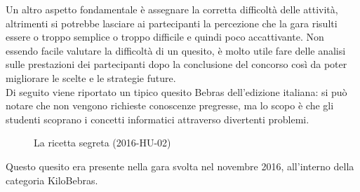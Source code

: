 \documentclass[12pt]{report}
\begin{document}
Un altro aspetto fondamentale è assegnare la corretta difficoltà delle attività, altrimenti si potrebbe lasciare ai partecipanti la percezione che la gara risulti essere o troppo semplice o troppo difficile e quindi poco accattivante.
Non essendo facile valutare la difficoltà di un quesito, è molto utile fare delle analisi sulle prestazioni dei partecipanti dopo la conclusione del concorso così da poter migliorare le scelte e le strategie future.
\\
Di seguito viene riportato un tipico quesito Bebras dell'edizione italiana: si può notare che non vengono richieste conoscenze pregresse, ma lo scopo è che gli studenti scoprano i concetti informatici attraverso divertenti problemi.
\\
\begin{figure}[H]
	\centering
	\caption{La ricetta segreta (2016-HU-02)}\label{fig:1}
\end{figure}
Questo quesito era presente nella gara svolta nel novembre 2016, all'interno della categoria KiloBebras.
\end{document}
